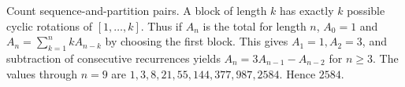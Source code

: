 Count sequence-and-partition pairs. A block of length $k$ has exactly $k$ possible cyclic rotations of $[1,\ldots,k]$. Thus if $A_n$ is the total for length $n$, $A_0=1$ and $A_n=\sum_{k=1}^n kA_{n-k}$ by choosing the first block. This gives $A_1=1,A_2=3$, and subtraction of consecutive recurrences yields $A_n=3A_{n-1}-A_{n-2}$ for $n\ge3$. The values through $n=9$ are $1,3,8,21,55,144,377,987,2584$. Hence $\boxed{2584}$.

